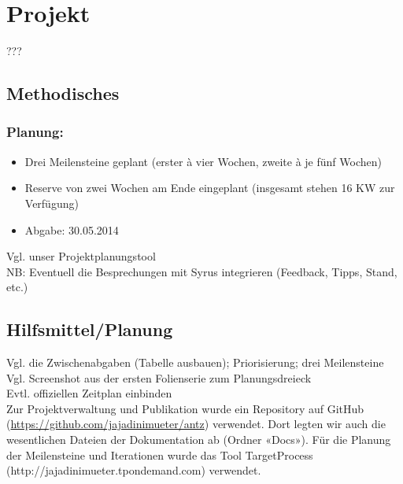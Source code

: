 
\chapter{Projekt}

???

\section{Methodisches}


\subsection*{Planung:}

\begin{itemize}[noitemsep]
\item Drei Meilensteine geplant (erster à vier Wochen, zweite à je fünf Wochen)
\item Reserve von zwei Wochen am Ende eingeplant (insgesamt stehen 16 KW zur Verfügung)
\item Abgabe: 30.05.2014
\end{itemize}

\vspace*{1cm}

Vgl. unser Projektplanungstool \\

NB: Eventuell die Besprechungen mit Syrus integrieren (Feedback, Tipps, Stand, etc.) \\


\vspace*{1cm}


\section{Hilfsmittel/Planung}


Vgl. die Zwischenabgaben (Tabelle ausbauen); Priorisierung; drei Meilensteine \\

Vgl. Screenshot aus der ersten Folienserie zum Planungsdreieck \\



Evtl. offiziellen Zeitplan einbinden \\


Zur Projektverwaltung und Publikation wurde ein Repository auf GitHub (\url{https://github.com/jajadinimueter/antz}) verwendet. Dort legten wir auch die wesentlichen Dateien der Dokumentation ab (Ordner «Docs»). Für die Planung der Meilensteine und Iterationen wurde das Tool TargetProcess (http://jajadinimueter.tpondemand.com) verwendet.



